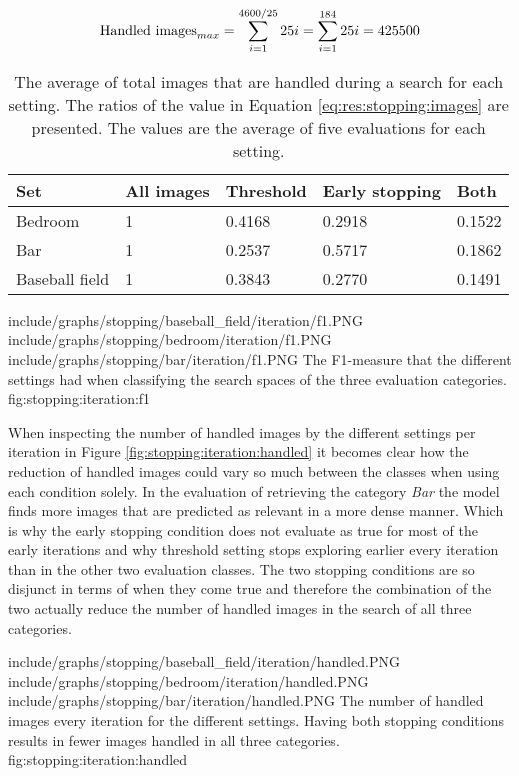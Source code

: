 \begin{equation}
\label{eq:res:stopping:images}
\textnormal{Handled images}_{max} = \sum_{i=1}^{4600/25}{25i} =\sum_{i=1}^{184}{25i} = 425500 
\end{equation}

\begin{table}
\centering
\begin{tabular}{l | p{2.6cm} p{2.6cm} p{3.2cm} p{1.6cm} }
\textbf{Set} & \textbf{All images} & \textbf{Threshold} & \textbf{Early stopping} & \textbf{Both} \\\hline
Bedroom & 1 & 0.4168 & 0.2918 & 0.1522 \\
Bar & 1 & 0.2537 & 0.5717 & 0.1862 \\
Baseball field & 1 & 0.3843 & 0.2770 & 0.1491 
\end{tabular}
\caption{The average of total images that are handled during a search for each setting. The ratios of the value in Equation \ref{eq:res:stopping:images} are presented. The values are the average of five evaluations for each setting.}
\label{table:res:stopping:images}
\end{table}

\tripfigurenear
{include/graphs/stopping/baseball_field/iteration/f1.PNG}
{include/graphs/stopping/bedroom/iteration/f1.PNG}
{include/graphs/stopping/bar/iteration/f1.PNG}
{The F1-measure that the different settings had when classifying the search spaces of the three evaluation categories.}
{fig:stopping:iteration:f1}

When inspecting the number of handled images by the different settings per iteration in Figure \ref{fig:stopping:iteration:handled} it becomes clear how the reduction of handled images could vary so much between the classes when using each condition solely. In the evaluation of retrieving the category \emph{Bar} the model finds more images that are predicted as relevant in a more dense manner. Which is why the early stopping condition does not evaluate as true for most of the early iterations and why threshold setting stops exploring earlier every iteration than in the other two evaluation classes. The two stopping conditions are so disjunct in terms of when they come true and therefore the combination of the two actually reduce the number of handled images in the search of all three categories. 

\tripfigurenear
{include/graphs/stopping/baseball_field/iteration/handled.PNG}
{include/graphs/stopping/bedroom/iteration/handled.PNG}
{include/graphs/stopping/bar/iteration/handled.PNG}
{The number of handled images every iteration for the different settings. Having both stopping conditions results in fewer images handled in all three categories.}
{fig:stopping:iteration:handled}


